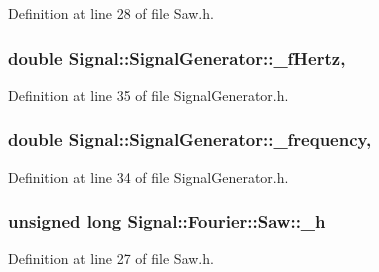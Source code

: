 Definition at line 28 of file Saw.\+h.

\hypertarget{classSignal_1_1SignalGenerator_a85a4702347352bab1c71e0a8df8437d6}{
\subsubsection[{\+\_\+f\+Hertz}]{\setlength{\rightskip}{0pt plus 5cm}double Signal\+::\+Signal\+Generator\+::\+\_\+f\+Hertz\hspace{0.3cm}{\ttfamily [protected]}, {\ttfamily [inherited]}}}\label{classSignal_1_1SignalGenerator_a85a4702347352bab1c71e0a8df8437d6}


Definition at line 35 of file Signal\+Generator.\+h.

\hypertarget{classSignal_1_1SignalGenerator_a7f107461333bce68c5dad412db96a8c2}{
\subsubsection[{\+\_\+frequency}]{\setlength{\rightskip}{0pt plus 5cm}double Signal\+::\+Signal\+Generator\+::\+\_\+frequency\hspace{0.3cm}{\ttfamily [protected]}, {\ttfamily [inherited]}}}\label{classSignal_1_1SignalGenerator_a7f107461333bce68c5dad412db96a8c2}


Definition at line 34 of file Signal\+Generator.\+h.

\hypertarget{classSignal_1_1Fourier_1_1Saw_a7e796347f04f0f4370a472587701b82b}{
\subsubsection[{\+\_\+h}]{\setlength{\rightskip}{0pt plus 5cm}unsigned long Signal\+::\+Fourier\+::\+Saw\+::\+\_\+h\hspace{0.3cm}{\ttfamily [protected]}}}\label{classSignal_1_1Fourier_1_1Saw_a7e796347f04f0f4370a472587701b82b}


Definition at line 27 of file Saw.\+h.

